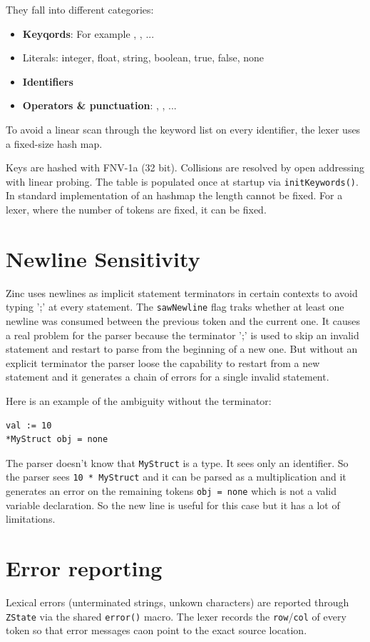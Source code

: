 They fall into different categories:
\begin{itemize}
    \item{\textbf{Keyqords}}: For example , ,  ...
    \item{Literals}: integer, float, string, boolean, true, false, none
    \item{\textbf{Identifiers}}
    \item{\textbf{Operators \& punctuation}}: \zn{+}, \zn{-}, \zn{==} ...
\end{itemize}

To avoid a linear scan through the keyword list on every identifier, the lexer uses a fixed-size hash map.

Keys are hashed with FNV-1a (32 bit). Collisions are resolved by open addressing with linear probing.
The table is populated once at startup via \texttt{initKeywords()}.
In standard implementation of an hashmap the length cannot be fixed. For a lexer, where the number of tokens are fixed, it can be fixed.


\section{Newline Sensitivity}

Zinc uses newlines as implicit statement terminators in certain contexts to avoid typing ';' at every statement.
The \texttt{sawNewline} flag traks whether at least one newline was consumed between the previous token and the current one.
It causes a real problem for the parser because the terminator ';' is used to skip an invalid statement and restart to parse from the beginning of a new one.
But without an explicit terminator the parser loose the capability to restart from a new statement and it generates a chain of errors for a single invalid statement.

Here is an example of the ambiguity without the terminator:
\begin{verbatim}
val := 10
*MyStruct obj = none
\end{verbatim}

The parser doesn't know that \texttt{MyStruct} is a type. It sees only an identifier.
So the parser sees \texttt{10 * MyStruct} and it can be parsed as a multiplication and it generates an error on the remaining tokens \texttt{obj = none} which is not a valid variable declaration.
So the new line is useful for this case but it has a lot of limitations.

\section{Error reporting}
Lexical errors (unterminated strings, unkown characters) are reported through \texttt{ZState} via the shared \texttt{error()} macro.
The lexer records the \texttt{row}/\texttt{col} of every token so that error messages caon point to the exact source location.

